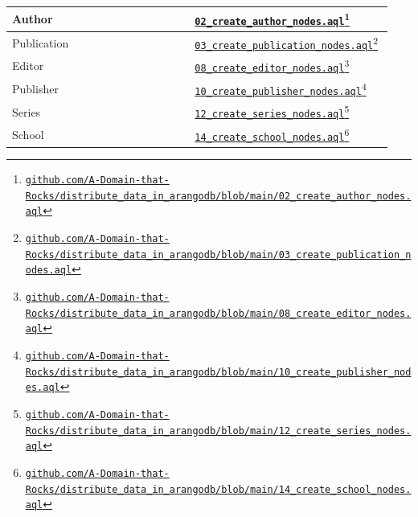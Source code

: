 \begin{center}
\begin{longtable}{p{0.47\linewidth}p{0.47\linewidth}}
		Author & \href{https://github.com/A-Domain-that-Rocks/distribute_data_in_arangodb/blob/main/02_create_author_nodes.aql}{\texttt{02\_create\_author\_nodes.aql}}\footnote{\href{https://github.com/A-Domain-that-Rocks/distribute\_data\_in\_arangodb/blob/main/02\_create\_author\_nodes.aql}{\texttt{github.com/A-Domain-that-Rocks/distribute\_data\_in\_arangodb/blob/main/02\_create\_author\_nodes.aql}}}\\
		\hline
		Publication & \href{https://github.com/A-Domain-that-Rocks/distribute_data_in_arangodb/blob/main/03_create_publication_nodes.aql}{\texttt{03\_create\_publication\_nodes.aql}}\footnote{\href{https://github.com/A-Domain-that-Rocks/distribute\_data\_in\_arangodb/blob/main/03\_create\_publication\_nodes.aql}{\texttt{github.com/A-Domain-that-Rocks/distribute\_data\_in\_arangodb/blob/main/03\_create\_publication\_nodes.aql}}}\\
		\hline
		Editor & \href{https://github.com/A-Domain-that-Rocks/distribute_data_in_arangodb/blob/main/08_create_editor_nodes.aql}{\texttt{08\_create\_editor\_nodes.aql}}\footnote{\href{https://github.com/A-Domain-that-Rocks/distribute\_data\_in\_arangodb/blob/main/08\_create\_editor\_nodes.aql}{\texttt{github.com/A-Domain-that-Rocks/distribute\_data\_in\_arangodb/blob/main/08\_create\_editor\_nodes.aql}}}\\
		\hline
		Publisher & \href{https://github.com/A-Domain-that-Rocks/distribute_data_in_arangodb/blob/main/10_create_publisher_nodes.aql}{\texttt{10\_create\_publisher\_nodes.aql}}\footnote{\href{https://github.com/A-Domain-that-Rocks/distribute\_data\_in\_arangodb/blob/main/10\_create\_publisher\_nodes.aql}{\texttt{github.com/A-Domain-that-Rocks/distribute\_data\_in\_arangodb/blob/main/10\_create\_publisher\_nodes.aql}}}\\
		\hline
		Series & \href{https://github.com/A-Domain-that-Rocks/distribute_data_in_arangodb/blob/main/12_create_series_nodes.aql}{\texttt{12\_create\_series\_nodes.aql}}\footnote{\href{https://github.com/A-Domain-that-Rocks/distribute\_data\_in\_arangodb/blob/main/12\_create\_series\_nodes.aql}{\texttt{github.com/A-Domain-that-Rocks/distribute\_data\_in\_arangodb/blob/main/12\_create\_series\_nodes.aql}}}\\
		\hline
		School & \href{https://github.com/A-Domain-that-Rocks/distribute_data_in_arangodb/blob/main/14_create_school_nodes.aql}{\texttt{14\_create\_school\_nodes.aql}}\footnote{\href{https://github.com/A-Domain-that-Rocks/distribute\_data\_in\_arangodb/blob/main/14\_create\_school\_nodes.aql}{\texttt{github.com/A-Domain-that-Rocks/distribute\_data\_in\_arangodb/blob/main/14\_create\_school\_nodes.aql}}}\\

\end{longtable}
\end{center}
